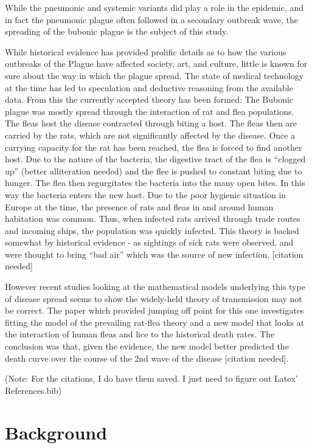 \documentclass [letterpaper, 12pt] {article}
\begin{document}
While the pneumonic and systemic variants did play a role in the epidemic, and in fact the pneumonic plague often followed in a secondary outbreak wave, the spreading of the bubonic plague is the subject of this study.

While historical evidence has provided prolific details as to how the various outbreaks of the Plague have affected society, art, and culture, little is known for sure about the way in which the plague spread. The state of medical technology at the time has led to speculation and deductive reasoning from the available data. From this the currently accepted theory has been formed: The Bubonic plague was mostly spread through the interaction of rat and flea populations. The fleas host the disease contracted through biting a host. The fleas then are carried by the rats, which are not significantly affected by the disease. Once a carrying capacity for the rat has been reached, the flea is forced to find another host. Due to the nature of the bacteria, the digestive tract of the flea is “clogged up” (better alliteration needed) and the flee is pushed to constant biting due to hunger. The flea then regurgitates the bacteria into the many open bites. In this way the bacteria enters the new host. 
Due to the poor hygienic situation in Europe at the time, the presence of rats and fleas in and around human habitation was common. Thus, when infected rats arrived through trade routes and incoming ships, the population was quickly infected. 
This theory is backed somewhat by historical evidence - as sightings of sick rats were observed, and were thought to bring “bad air” which was the source of new infection. [citation needed]

However recent studies looking at the mathematical models underlying this type of disease spread seems to show the widely-held theory of transmission may not be correct. The paper which provided jumping off point for this one investigates fitting the model of the prevailing rat-flea theory and a new model that looks at the interaction of human fleas and lice to the historical death rates. The conclusion was that, given the evidence, the new model better predicted the death curve over the course of the 2nd wave of the disease [citation needed].

(Note: For the citations, I do have them saved. I just need to figure out Latex' References.bib)
\pagebreak

\section {Background}
\end{document}
